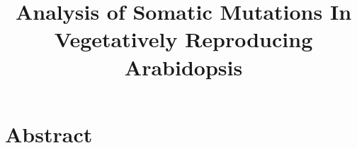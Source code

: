 \documentclass[12pt]{article}
\title{Analysis of Somatic Mutations In Vegetatively Reproducing Arabidopsis}
\date{}
\begin{document}
\maketitle





\section{Abstract}
\end{document}
